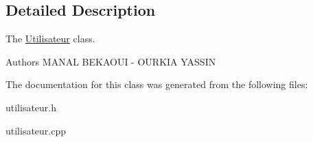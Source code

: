 \subsection{Detailed Description}
The \mbox{\hyperlink{class_utilisateur}{Utilisateur}} class. 

\begin{DoxyAuthor}{Authors}
M\+A\+N\+AL B\+E\+K\+A\+O\+UI -\/ O\+U\+R\+K\+IA Y\+A\+S\+S\+IN 
\end{DoxyAuthor}


The documentation for this class was generated from the following files\+:\begin{DoxyCompactItemize}
\item 
utilisateur.\+h\item 
utilisateur.\+cpp\end{DoxyCompactItemize}
